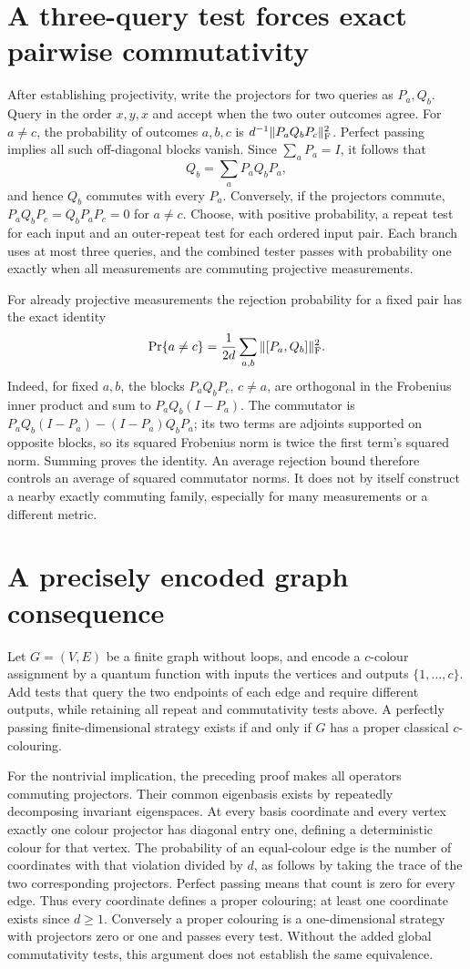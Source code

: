 \documentclass[11pt]{article}
\begin{document}
\section{A three-query test forces exact pairwise commutativity}
After establishing projectivity, write the projectors for two
queries as $P_a,Q_b$. Query in the order $x,y,x$ and accept
when the two outer outcomes agree. For $a\ne c$, the probability
of outcomes $a,b,c$ is
$d^{-1}\|P_aQ_bP_c\|_{\rm F}^2$.
Perfect passing implies all such off-diagonal blocks vanish.
Since $\sum_aP_a=I$, it follows that
\[
 Q_b=\sum_aP_aQ_bP_a,
\]
and hence $Q_b$ commutes with every $P_a$. Conversely, if the
projectors commute, $P_aQ_bP_c=Q_bP_aP_c=0$ for $a\ne c$.
Choose, with positive probability, a repeat test for each input
and an outer-repeat test for each ordered input pair. Each branch
uses at most three queries, and the combined tester passes with
probability one exactly when all measurements are commuting
projective measurements.

For already projective measurements the rejection probability
for a fixed pair has the exact identity
\[
 \Pr\{a\ne c\}
 =\frac1{2d}\sum_{a,b}\|[P_a,Q_b]\|_{\rm F}^2.
\]
Indeed, for fixed $a,b$, the blocks $P_aQ_bP_c$, $c\ne a$,
are orthogonal in the Frobenius inner product and sum to
$P_aQ_b(I-P_a)$. The commutator is
$P_aQ_b(I-P_a)-(I-P_a)Q_bP_a$; its two terms are adjoints
supported on opposite blocks, so its squared Frobenius norm
is twice the first term's squared norm. Summing proves the
identity. An average rejection bound therefore controls an
average of squared commutator norms. It does not by itself
construct a nearby exactly commuting family, especially for
many measurements or a different metric.

\section{A precisely encoded graph consequence}
Let $G=(V,E)$ be a finite graph without loops, and encode a
$c$-colour assignment by a quantum function with inputs the
vertices and outputs $\{1,\ldots,c\}$. Add tests that query the
two endpoints of each edge and require different outputs,
while retaining all repeat and commutativity tests above.
A perfectly passing finite-dimensional strategy exists if and
only if $G$ has a proper classical $c$-colouring.

For the nontrivial implication, the preceding proof makes all
operators commuting projectors. Their common eigenbasis exists
by repeatedly decomposing invariant eigenspaces. At every basis
coordinate and every vertex exactly one colour projector has
diagonal entry one, defining a deterministic colour for that
vertex. The probability of an equal-colour edge is the number
of coordinates with that violation divided by $d$, as follows
by taking the trace of the two corresponding projectors.
Perfect passing means that count is zero for every edge. Thus
every coordinate defines a proper colouring; at least one
coordinate exists since $d\ge1$. Conversely a proper colouring
is a one-dimensional strategy with projectors zero or one and
passes every test. Without the added global commutativity tests,
this argument does not establish the same equivalence.
\end{document}

